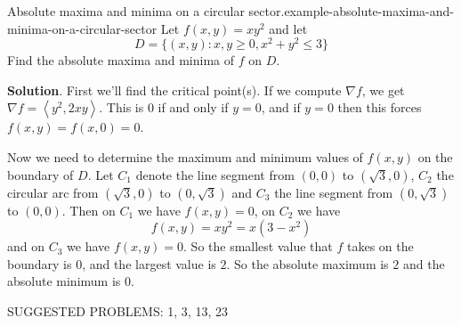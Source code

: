 \documentclass[10pt,]{book}
\numberwithin{equation}{section}
\newcommand{\grad}{\nabla}
\newcommand{\dotprod}[1]{\left\langle #1 \right\rangle}
\begin{document}
\begin{example}{Absolute maxima and minima on a circular sector.}{example-absolute-maxima-and-minima-on-a-circular-sector}%
\hypertarget{p-1436}{}%
Let \(f(x,y) = xy^{2}\) and let%
\begin{equation*}
D = \{(x,y) : x,y \geq 0, x^{2} + y^{2} \leq 3\}
\end{equation*}
Find the absolute maxima and minima of \(f\) on \(D\).%
\par\smallskip%
\noindent\textbf{Solution}.\hypertarget{solution-234}{}\quad%
\hypertarget{p-1437}{}%
First we'll find the critical point(s). If we compute \(\grad f\), we get \(\grad f = \dotprod{y^{2}, 2xy}\). This is \(0\) if and only if \(y=0\), and if \(y=0\) then this forces \(f(x,y) = f(x,0) = 0\).%
\par
\hypertarget{p-1438}{}%
Now we need to determine the maximum and minimum values of \(f(x,y)\) on the boundary of \(D\). Let \(C_{1}\) denote the line segment from \((0,0)\) to \((\sqrt{3},0)\), \(C_{2}\) the circular arc from \((\sqrt{3},0)\) to \((0,\sqrt{3})\) and \(C_{3}\) the line segment from \((0,\sqrt{3})\) to \((0,0)\). Then on \(C_{1}\) we have \(f(x,y) = 0\), on \(C_{2}\) we have%
\begin{equation*}
f(x,y) = xy^{2} = x(3-x^{2})
\end{equation*}
and on \(C_{3}\) we have \(f(x,y) = 0\). So the smallest value that \(f\) takes on the boundary is \(0\), and the largest value is \(2\). So the absolute maximum is \(2\) and the absolute minimum is \(0\).%
\end{example}
\hypertarget{p-1439}{}%
SUGGESTED PROBLEMS: 1, 3, 13, 23%
%
%
\typeout{************************************************}
\typeout{************************************************}
%
\end{document}
